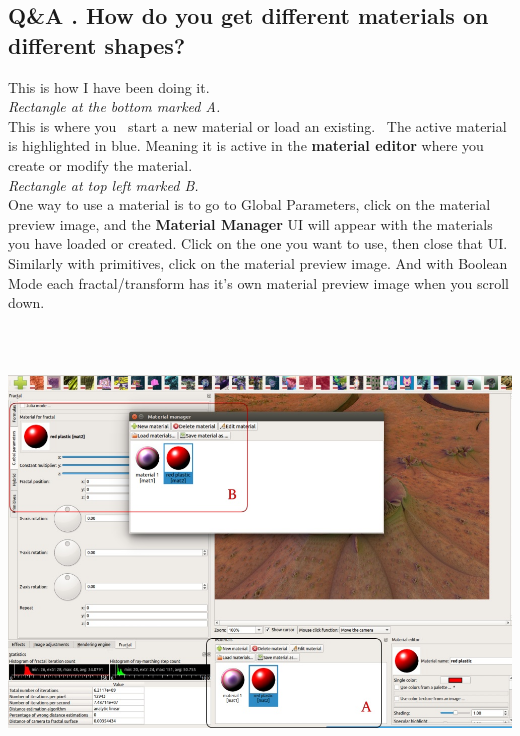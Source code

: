 \subsection{Q\&A . How do you get different materials on different
	shapes?}\label{qa-.-how-do-you-get-different-materials-on-different-shapes}

This is how I have been doing it.\\[2\baselineskip]\emph{Rectangle at the bottom
	marked A.}\\[2\baselineskip]This is where you~ start a new material or load an
existing.~ The active material is highlighted in blue. Meaning it is active in
the \textbf{material editor} where you create or modify the
material.\\[2\baselineskip]\emph{Rectangle at top left marked
	B.}\\[2\baselineskip]One way to use a material is to go to Global Parameters,
click on the material preview image, and the \textbf{Material Manager} UI will
appear with the materials you have loaded or created. Click on the one you want
to use, then close that UI.\\ Similarly with primitives, click on the material
preview image. And with Boolean Mode each fractal/transform has it's own
material preview image when you scroll down.

\includegraphics[width=6.69291in,height=4.68465in]{img/manual/media/image32.jpg}

